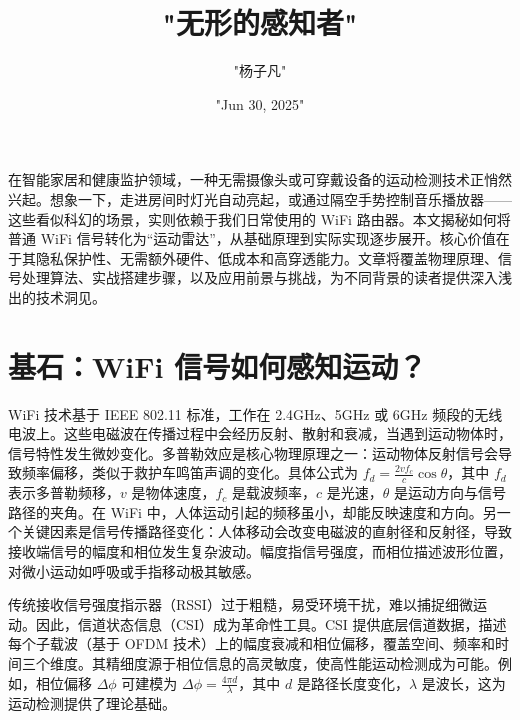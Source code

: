 \title{"无形的感知者"}
\author{"杨子凡"}
\date{"Jun 30, 2025"}
\maketitle
在智能家居和健康监护领域，一种无需摄像头或可穿戴设备的运动检测技术正悄然兴起。想象一下，走进房间时灯光自动亮起，或通过隔空手势控制音乐播放器——这些看似科幻的场景，实则依赖于我们日常使用的 WiFi 路由器。本文揭秘如何将普通 WiFi 信号转化为“运动雷达”，从基础原理到实际实现逐步展开。核心价值在于其隐私保护性、无需额外硬件、低成本和高穿透能力。文章将覆盖物理原理、信号处理算法、实战搭建步骤，以及应用前景与挑战，为不同背景的读者提供深入浅出的技术洞见。\par
\chapter{基石：WiFi 信号如何感知运动？}
WiFi 技术基于 IEEE 802.11 标准，工作在 2.4GHz、5GHz 或 6GHz 频段的无线电波上。这些电磁波在传播过程中会经历反射、散射和衰减，当遇到运动物体时，信号特性发生微妙变化。多普勒效应是核心物理原理之一：运动物体反射信号会导致频率偏移，类似于救护车鸣笛声调的变化。具体公式为 $f_d = \frac{2v f_c}{c} \cos\theta$，其中 $f_d$ 表示多普勒频移，$v$ 是物体速度，$f_c$ 是载波频率，$c$ 是光速，$\theta$ 是运动方向与信号路径的夹角。在 WiFi 中，人体运动引起的频移虽小，却能反映速度和方向。另一个关键因素是信号传播路径变化：人体移动会改变电磁波的直射径和反射径，导致接收端信号的幅度和相位发生复杂波动。幅度指信号强度，而相位描述波形位置，对微小运动如呼吸或手指移动极其敏感。\par
传统接收信号强度指示器（RSSI）过于粗糙，易受环境干扰，难以捕捉细微运动。因此，信道状态信息（CSI）成为革命性工具。CSI 提供底层信道数据，描述每个子载波（基于 OFDM 技术）上的幅度衰减和相位偏移，覆盖空间、频率和时间三个维度。其精细度源于相位信息的高灵敏度，使高性能运动检测成为可能。例如，相位偏移 $\Delta\phi$ 可建模为 $\Delta\phi = \frac{4\pi d}{\lambda}$，其中 $d$ 是路径长度变化，$\lambda$ 是波长，这为运动检测提供了理论基础。\par
